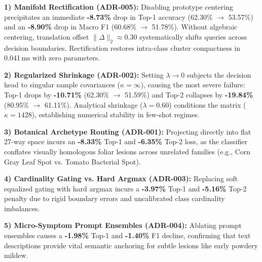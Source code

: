 \noindent\textbf{1) Manifold Rectification (ADR-005):} Disabling prototype centering precipitates an immediate \textbf{-8.73\%} drop in Top-1 accuracy (62.30\% $\to$ 53.57\%) and an \textbf{-8.90\%} drop in Macro F1 (60.68\% $\to$ 51.78\%). Without algebraic centering, translation offset $\|\Delta\|_2 \approx 0.30$ systematically shifts queries across decision boundaries. Rectification restores intra-class cluster compactness in 0.041\,ms with zero parameters.

\noindent\textbf{2) Regularized Shrinkage (ADR-002):} Setting $\lambda \to 0$ subjects the decision head to singular sample covariances ($\kappa = \infty$), causing the most severe failure: Top-1 drops by \textbf{-10.71\%} (62.30\% $\to$ 51.59\%) and Top-2 collapses by \textbf{-19.84\%} (80.95\% $\to$ 61.11\%). Analytical shrinkage ($\lambda = 0.60$) conditions the matrix ($\kappa = 1428$), establishing numerical stability in few-shot regimes.

\noindent\textbf{3) Botanical Archetype Routing (ADR-001):} Projecting directly into flat 27-way space incurs an \textbf{-8.33\%} Top-1 and \textbf{-6.35\%} Top-2 loss, as the classifier conflates visually homologous foliar lesions across unrelated families (e.g., Corn Gray Leaf Spot vs. Tomato Bacterial Spot).

\noindent\textbf{4) Cardinality Gating vs. Hard Argmax (ADR-003):} Replacing soft equalized gating with hard argmax incurs a \textbf{-3.97\%} Top-1 and \textbf{-5.16\%} Top-2 penalty due to rigid boundary errors and uncalibrated class cardinality imbalances.

\noindent\textbf{5) Micro-Symptom Prompt Ensembles (ADR-004):} Ablating prompt ensembles causes a \textbf{-1.98\%} Top-1 and \textbf{-1.40\%} F1 decline, confirming that text descriptions provide vital semantic anchoring for subtle lesions like early powdery mildew.

